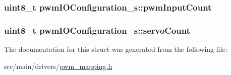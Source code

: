 \hypertarget{structpwmIOConfiguration__s_a4d254e564c65776178df66931d612f16}{
\subsubsection[{pwm\+Input\+Count}]{\setlength{\rightskip}{0pt plus 5cm}uint8\+\_\+t pwm\+I\+O\+Configuration\+\_\+s\+::pwm\+Input\+Count}}\label{structpwmIOConfiguration__s_a4d254e564c65776178df66931d612f16}
\hypertarget{structpwmIOConfiguration__s_a634ede6d9c6144bdbc1e1bfb3818051d}{
\subsubsection[{servo\+Count}]{\setlength{\rightskip}{0pt plus 5cm}uint8\+\_\+t pwm\+I\+O\+Configuration\+\_\+s\+::servo\+Count}}\label{structpwmIOConfiguration__s_a634ede6d9c6144bdbc1e1bfb3818051d}


The documentation for this struct was generated from the following file\+:\begin{DoxyCompactItemize}
\item 
src/main/drivers/\hyperlink{pwm__mapping_8h}{pwm\+\_\+mapping.\+h}\end{DoxyCompactItemize}
